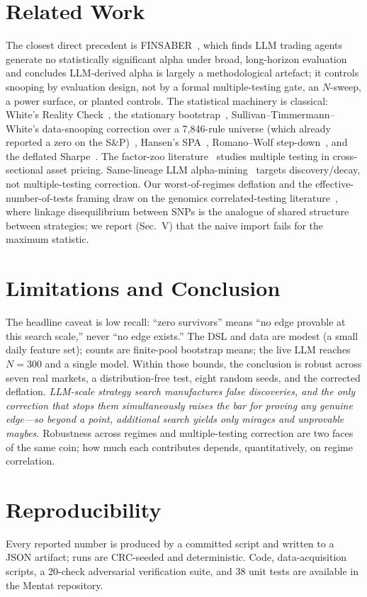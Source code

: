 \documentclass[conference]{IEEEtran}
\begin{document}
\section{Related Work}
The closest direct precedent is FINSABER~\cite{finsaber}, which finds LLM trading agents
generate no statistically significant alpha under broad, long-horizon evaluation and concludes
LLM-derived alpha is largely a methodological artefact; it controls snooping by evaluation
design, not by a formal multiple-testing gate, an $N$-sweep, a power surface, or planted
controls. The statistical machinery is classical: White's Reality Check~\cite{rc}, the
stationary bootstrap~\cite{politis}, Sullivan--Timmermann--White's data-snooping correction
over a 7{,}846-rule universe (which already reported a zero on the S\&P)~\cite{stw}, Hansen's
SPA~\cite{spa}, Romano--Wolf step-down~\cite{romanowolf}, and the deflated Sharpe~\cite{dsr}.
The factor-zoo literature~\cite{harvey} studies multiple testing in cross-sectional asset
pricing. Same-lineage LLM alpha-mining~\cite{alphaagent} targets discovery/decay, not
multiple-testing correction. Our worst-of-regimes deflation and the effective-number-of-tests
framing draw on the genomics correlated-testing literature~\cite{nyholt,liji}, where linkage
disequilibrium between SNPs is the analogue of shared structure between strategies; we report
(Sec.~V) that the naive import fails for the maximum statistic.

\section{Limitations and Conclusion}
The headline caveat is low recall: ``zero survivors'' means ``no edge provable at this search
scale,'' never ``no edge exists.'' The DSL and data are modest (a small daily feature set);
counts are finite-pool bootstrap means; the live LLM reaches $N{=}300$ and a single model.
Within those bounds, the conclusion is robust across seven real markets, a distribution-free
test, eight random seeds, and the corrected deflation. \emph{LLM-scale strategy search
manufactures false discoveries, and the only correction that stops them simultaneously raises
the bar for proving any genuine edge---so beyond a point, additional search yields only
mirages and unprovable maybes.} Robustness across regimes and multiple-testing correction are
two faces of the same coin; how much each contributes depends, quantitatively, on regime
correlation.

\section*{Reproducibility}
Every reported number is produced by a committed script and written to a JSON artifact; runs
are CRC-seeded and deterministic. Code, data-acquisition scripts, a 20-check adversarial
verification suite, and 38 unit tests are available in the Mentat repository.
\end{document}
